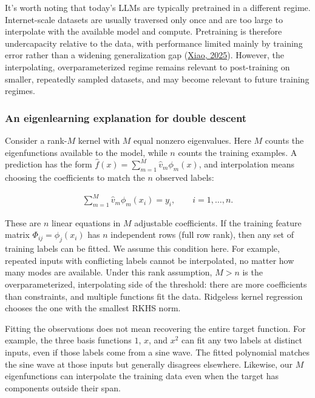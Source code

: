 It's worth noting that today's LLMs are typically pretrained in a different regime. Internet-scale datasets
are usually traversed only once and are too large to interpolate with the available
model and compute. Pretraining is therefore undercapacity relative to the data, with
performance limited mainly by training error rather than a widening generalization gap
(\href{https://arxiv.org/pdf/2409.15156}{Xiao, 2025}). However, the interpolating, overparameterized regime remains
relevant to post-training on smaller, repeatedly sampled datasets, and may become
relevant to future training regimes.



\subsubsection*{An eigenlearning explanation for double descent}

Consider a rank-$M$ kernel with $M$ equal nonzero eigenvalues. Here $M$ counts the
eigenfunctions available to the model, while $n$ counts the training examples. A
prediction has the form $\hat f(x)=\sum_{m=1}^{M}\hat{v}_m\phi_m(x)$, and interpolation
means choosing the coefficients to match the $n$ observed labels:

\begin{align}
    \sum_{m=1}^{M}\hat{v}_m\phi_m(x_i)=y_i,\qquad i=1,\ldots,n.
\end{align}

These are $n$ linear equations in $M$ adjustable coefficients. If the training
feature matrix $\Phi_{ij}=\phi_j(x_i)$ has $n$ independent rows (full row rank), then
any set of training labels can be fitted. We assume this condition here. For example, repeated inputs with conflicting
labels cannot be interpolated, no matter how many modes are available. Under this
rank assumption, $M>n$ is the overparameterized, interpolating side of the threshold:
there are more coefficients than constraints, and multiple functions fit the data.
Ridgeless kernel regression chooses the one with the smallest RKHS norm.

Fitting the observations does not mean recovering the entire target function.
For example, the three basis functions $1$, $x$, and $x^2$ can fit any two labels
at distinct inputs, even if those labels come from a sine wave. The fitted polynomial
matches the sine wave at those inputs but generally disagrees elsewhere. Likewise,
our $M$ eigenfunctions can interpolate the training data even when the target has
components outside their span.

